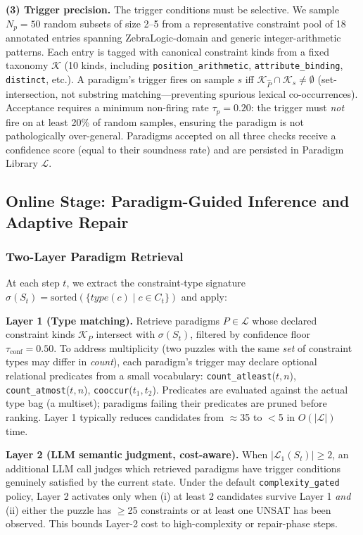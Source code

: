 \textbf{(3) Trigger precision.} The trigger conditions must be selective. We sample $N_p = 50$ random subsets of size 2--5 from a representative constraint pool of 18 annotated entries spanning ZebraLogic-domain and generic integer-arithmetic patterns. Each entry is tagged with canonical constraint kinds from a fixed taxonomy $\mathcal{K}$ (10 kinds, including \texttt{position\_arithmetic}, \texttt{attribute\_binding}, \texttt{distinct}, etc.). A paradigm's trigger fires on sample $s$ iff $\mathcal{K}_{\hat{P}} \cap \mathcal{K}_s \neq \emptyset$ (set-intersection, not substring matching—preventing spurious lexical co-occurrences). Acceptance requires a minimum non-firing rate $\tau_p = 0.20$: the trigger must \textit{not} fire on at least 20\% of random samples, ensuring the paradigm is not pathologically over-general. Paradigms accepted on all three checks receive a confidence score (equal to their soundness rate) and are persisted in Paradigm Library $\mathcal{L}$.

\subsection{Online Stage: Paradigm-Guided Inference and Adaptive Repair}

\subsubsection{Two-Layer Paradigm Retrieval}
\label{ssec:retrieval}

At each step $t$, we extract the constraint-type signature $\sigma(S_t) = \text{sorted}(\{type(c) \mid c \in C_t\})$ and apply:

\textbf{Layer 1 (Type matching).} Retrieve paradigms $P \in \mathcal{L}$ whose declared constraint kinds $\mathcal{K}_P$ intersect with $\sigma(S_t)$, filtered by confidence floor $\tau_{\text{conf}} = 0.50$. To address multiplicity (two puzzles with the same \textit{set} of constraint types may differ in \textit{count}), each paradigm's trigger may declare optional relational predicates from a small vocabulary: \texttt{count\_atleast}($t, n$), \texttt{count\_atmost}($t, n$), \texttt{cooccur}($t_1, t_2$). Predicates are evaluated against the actual type bag (a multiset); paradigms failing their predicates are pruned before ranking. Layer 1 typically reduces candidates from $\approx$35 to $<$5 in $O(|\mathcal{L}|)$ time.

\textbf{Layer 2 (LLM semantic judgment, cost-aware).} When $|\mathcal{L}_1(S_t)| \geq 2$, an additional LLM call judges which retrieved paradigms have trigger conditions genuinely satisfied by the current state. Under the default \texttt{complexity\_gated} policy, Layer 2 activates only when (i) at least 2 candidates survive Layer 1 \textit{and} (ii) either the puzzle has $\geq$25 constraints or at least one UNSAT has been observed. This bounds Layer-2 cost to high-complexity or repair-phase steps.

